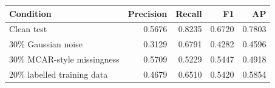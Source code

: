 \begin{tabular}{lrrrr}
\toprule
Condition & Precision & Recall & F1 & AP\\
\midrule
Clean test & 0.5676 & 0.8235 & 0.6720 & 0.7803\\
30\% Gaussian noise & 0.3129 & 0.6791 & 0.4282 & 0.4596\\
30\% MCAR-style missingness & 0.5709 & 0.5229 & 0.5447 & 0.4918\\
20\% labelled training data & 0.4679 & 0.6510 & 0.5420 & 0.5854\\
\bottomrule
\end{tabular}

